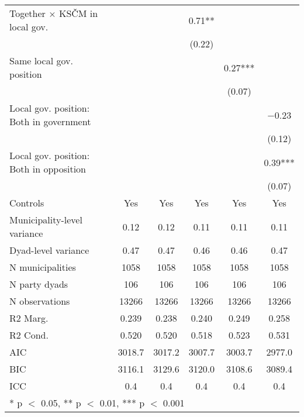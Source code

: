 \begin{table}
\begin{tabular}[t]{lccccc}
Together × KSČM in local gov.           &                 &                 & \num{0.71}**   &                 &                 \\
&                 &                 & (\num{0.22})   &                 &                 \\
Same local gov. position                &                 &                 &                 & \num{0.27}***  &                 \\
&                 &                 &                 & (\num{0.07})   &                 \\
Local gov. position: Both in government &                 &                 &                 &                 & \num{-0.23}   \\
&                 &                 &                 &                 & (\num{0.12})   \\
Local gov. position: Both in opposition &                 &                 &                 &                 & \num{0.39}***  \\
&                 &                 &                 &                 & (\num{0.07})   \\
Controls & Yes & Yes & Yes & Yes & Yes \\
\midrule
Municipality-level variance             & \num{0.12}     & \num{0.12}     & \num{0.11}     & \num{0.11}     & \num{0.11}     \\
Dyad-level variance                     & \num{0.47}     & \num{0.47}     & \num{0.46}     & \num{0.46}     & \num{0.47}     \\
N municipalities                        & \num{1058}  & \num{1058}  & \num{1058}  & \num{1058}  & \num{1058}  \\
N party dyads                           & \num{106}   & \num{106}   & \num{106}   & \num{106}   & \num{106}   \\
N observations                          & \num{13266}    & \num{13266}    & \num{13266}    & \num{13266}    & \num{13266}    \\
R2 Marg.                                & \num{0.239}    & \num{0.238}    & \num{0.240}    & \num{0.249}    & \num{0.258}    \\
R2 Cond.                                & \num{0.520}    & \num{0.520}    & \num{0.518}    & \num{0.523}    & \num{0.531}    \\
AIC                                     & \num{3018.7}   & \num{3017.2}   & \num{3007.7}   & \num{3003.7}   & \num{2977.0}   \\
BIC                                     & \num{3116.1}   & \num{3129.6}   & \num{3120.0}   & \num{3108.6}   & \num{3089.4}   \\
ICC                                     & \num{0.4}      & \num{0.4}      & \num{0.4}      & \num{0.4}      & \num{0.4}      \\
\bottomrule
\multicolumn{6}{l}{\rule{0pt}{1em}* p $<$ 0.05, ** p $<$ 0.01, *** p $<$ 0.001}\\
\end{tabular}
\end{table}
